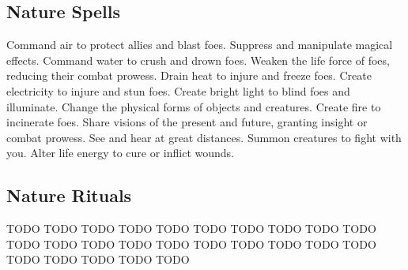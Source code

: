 \subsection{Nature Spells}\label{Nature Spells}
\begin{spelllist}
 Command air to protect allies and blast foes.
 Suppress and manipulate magical effects.
 Command water to crush and drown foes.
 Weaken the life force of foes, reducing their combat prowess.
 Drain heat to injure and freeze foes.
 Create electricity to injure and stun foes.
 Create bright light to blind foes and illuminate.
 Change the physical forms of objects and creatures.
 Create fire to incinerate foes.
 Share visions of the present and future, granting insight or combat prowess.
 See and hear at great distances.
 Summon creatures to fight with you.
 Alter life energy to cure or inflict wounds.
\end{spelllist}
\subsection{Nature Rituals}\label{Nature Rituals}
\begin{spelllist}
 TODO
 TODO
 TODO
 TODO
 TODO
 TODO
 TODO
 TODO
 TODO
 TODO
 TODO
 TODO
 TODO
 TODO
 TODO
 TODO
 TODO
 TODO
 TODO
 TODO
 TODO
 TODO
 TODO
 TODO
 TODO
\end{spelllist}